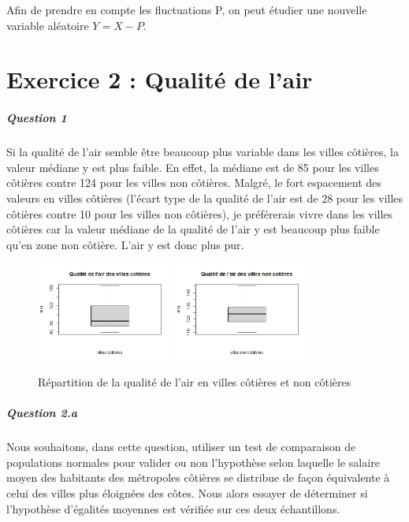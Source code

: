 \documentclass[oneside,a4paper,13pt]{book}
\begin{document}
Afin de prendre en compte les fluctuations P, on peut étudier une nouvelle variable aléatoire $Y = X-P$.

\chapter*{Exercice 2 : Qualité de l’air}

\paragraph{Question 1}
Si la qualité de l'air semble être beaucoup plus variable dans les villes côtières, la valeur médiane y est plus faible. En effet, la médiane est de 85 pour les villes côtières contre 124 pour les villes non côtières. Malgré, le fort espacement des valeurs en villes côtières (l'écart type de la qualité de l'air est de 28 pour les villes côtières contre 10 pour les villes non côtières), je préférerais vivre dans les villes côtières car la valeur médiane de la qualité de l'air y est beaucoup plus faible qu'en zone non côtière. L'air y est donc plus pur. 

\begin{figure}[h]
  \centering
  \includegraphics[width=0.4\textwidth]{Images/Qaircot.png}\label{fig:f1}
  \hfill
  \includegraphics[width=0.4\textwidth]{Images/Qairnoncot.png}\label{fig:f2}
  \caption{Répartition de la qualité de l'air en villes côtières et non côtières}
\end{figure}

\paragraph{Question 2.a}
Nous souhaitons, dans cette question, utiliser un test de comparaison de populations normales pour valider ou non l’hypothèse selon laquelle le salaire moyen des habitants des métropoles côtières se distribue de façon équivalente à celui des villes plus éloignées des côtes. Nous alors essayer de déterminer si l'hypothèse d'égalités moyennes est vérifiée sur ces deux échantillons. 
\end{document}
